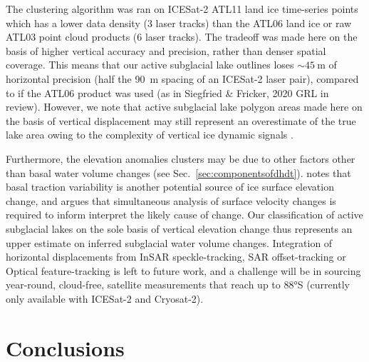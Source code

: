 The clustering algorithm was ran on ICESat-2 ATL11 land ice time-series \citep{SmithATLASICESat2L3B2021} points which has a lower data density (3 laser tracks) than the ATL06 land ice \citep{SmithATLASICESat2L3A2020} or raw ATL03 \citep{NeumannATLASICESat2L2A2020} point cloud products (6 laser tracks).
The tradeoff was made here on the basis of higher vertical accuracy and precision, rather than denser spatial coverage.
This means that our active subglacial lake outlines loses $\sim\SI{45}{\metre}$ of horizontal precision (half the \SI{90}{\metre} spacing of an ICESat-2 laser pair), compared to if the ATL06 product was used (as in Siegfried \& Fricker, 2020 GRL in review). %
However, we note that active subglacial lake polygon areas made here on the basis of vertical displacement may still represent an overestimate of the true lake area owing to the complexity of vertical ice dynamic signals \citep[c.f.][]{SergienkoCausessuddenshortterm2007,LiRadarSoundingConfirms2020}.

Furthermore, the elevation anomalies clusters may be due to other factors other than basal water volume changes (see Sec.~\ref{sec:componentsofdhdt}).
\citet{SergienkoCausessuddenshortterm2007} notes that basal traction variability is another potential source of ice surface elevation change, and argues that simultaneous analysis of surface velocity changes \citep[e.g.][]{SiegfriedEpisodicicevelocity2016} is required to inform interpret the likely cause of change.
Our classification of active subglacial lakes on the sole basis of vertical elevation change thus represents an upper estimate on inferred subglacial water volume changes.
Integration of horizontal displacements from InSAR speckle-tracking, SAR offset-tracking or Optical feature-tracking \citep[e.g.][]{GardnerIncreasedWestAntarctic2018} is left to future work, and a challenge will be in sourcing year-round, cloud-free, satellite measurements that reach up to 88°S (currently only available with ICESat-2 and Cryosat-2).

\section{Conclusions}

